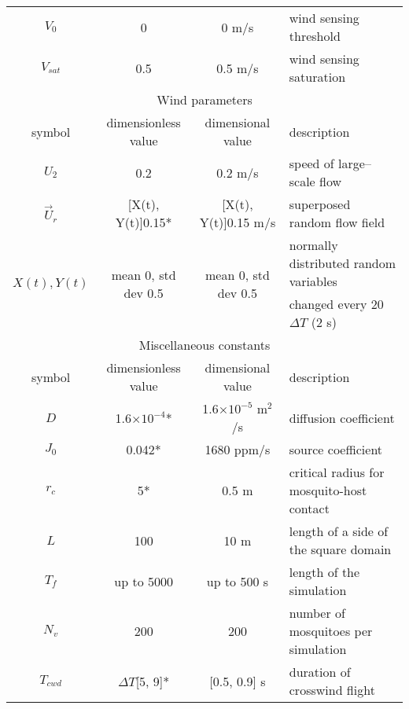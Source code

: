 \documentclass[10pt]{article}
\begin{document}
\begin{table}[!htp]
\begin{center}
\begin{tabular}{|c|c|c|l|}
			$V_0$ & 0 & 0 m/s & wind sensing threshold\\
			$V_{sat}$ & 0.5 & 0.5 m/s & wind sensing saturation\\
			\hline \hline
			\multicolumn{4}{|c|}{Wind parameters} \\
			\hline 
			symbol & dimensionless value & dimensional value & description \\
			\hline
			$U_2$ & 0.2 & 0.2 m/s & speed of large--scale flow\\
			$\vec{U}_r$ & [X(t), Y(t)]0.15* & [X(t), Y(t)]0.15 m/s & superposed random flow field \\[5pt]
			\multirow{2}{*}{$X(t),Y(t)$} & \multirow{2}{*}{mean 0, std dev 0.5} & \multirow{2}{*}{mean 0, std dev 0.5}&
			normally distributed random variables  \\
			& & & changed every 20 $\Delta T$ (2 s)\\
			\hline \hline
			\multicolumn{4}{|c|}{Miscellaneous constants} \\
			\hline 
			symbol & dimensionless value & dimensional value & description \\
			\hline
			$D$ & 1.6$\times 10^{-4}$* & 1.6$\times 10^{-5}$ m$^2$/s& diffusion coefficient\\
			$J_0$ & 0.042* & 1680 ppm/s & source coefficient\\
			$r_c$ & 5* & 0.5 m & critical radius for mosquito-host contact  \\
			$L$ & 100 & 10 m & length of a side of the square domain \\
			$T_f$ & up to 5000 & up to 500 s & length of the simulation \\
			$N_v$ & 200 & 200 & number of mosquitoes per simulation \\
			$T_{cwd}$ & $\Delta T$[5, 9]* & [0.5, 0.9] s & 
			duration of crosswind flight  \\
			\hline
		\end{tabular}
	\end{center}\label{tab:finalparams}
\end{table}
\end{document}
